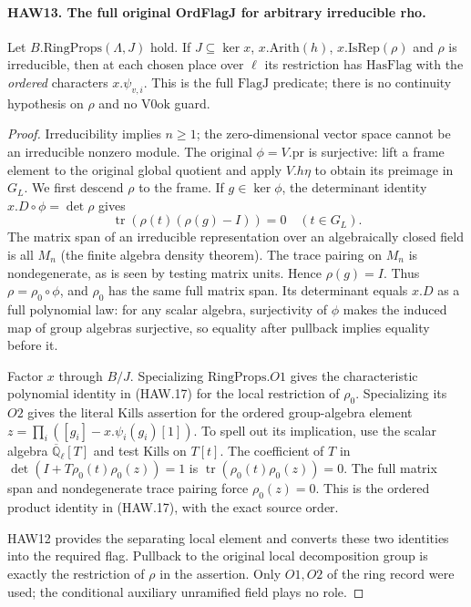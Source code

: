 \documentclass[11pt,a4paper]{article}
\numberwithin{equation}{section}
\theoremstyle{remark}\newtheorem{remark}[theorem]{Remark}
\begin{document}
\paragraph{HAW13. The full original OrdFlagJ for arbitrary irreducible rho.}
\label{claim:HAW13}
Let $B.\mathrm{RingProps}(\Lambda,J)$ hold.  If
$J\subseteq\ker x$, $x.\mathrm{Arith}(h)$,
$x.\mathrm{IsRep}(\rho)$ and $\rho$ is irreducible, then
at each chosen place over $\ell$ its restriction has
$\mathrm{HasFlag}$ with the \emph{ordered} characters
$x.\psi_{v,i}$.  This is the full $\mathrm{FlagJ}$ predicate;
there is no continuity hypothesis on $\rho$ and no
$\mathrm{V0ok}$ guard.
\begin{proof}
Irreducibility implies $n\ge1$; the zero-dimensional vector
space cannot be an irreducible nonzero module.  The original
$\phi=V.\mathrm{pr}$ is surjective: lift a frame element to
the original global quotient and apply $V.h\eta$ to obtain
its preimage in $G_L$.
We first descend $\rho$ to the frame.  If $g\in\ker\phi$,
the determinant identity $x.D\circ\phi=\det\rho$ gives
\[
          \operatorname{tr}(\rho(t)(\rho(g)-I))=0
                                           \quad(t\in G_L).
\]
The matrix span of an irreducible representation over an
algebraically closed field is all $M_n$ (the finite algebra
density theorem).  The trace pairing on $M_n$ is
nondegenerate, as is seen by testing matrix units.  Hence
$\rho(g)=I$.  Thus $\rho=\rho_0\circ\phi$, and $\rho_0$
has the same full matrix span.  Its determinant equals
$x.D$ as a full polynomial law: for any scalar algebra,
surjectivity of $\phi$ makes the induced map of group
algebras surjective, so equality after pullback implies
equality before it.

Factor $x$ through $B/J$.  Specializing $\mathrm{RingProps}.O1$
gives the characteristic polynomial identity in (HAW.17)
for the local restriction of $\rho_0$.  Specializing its
$O2$ gives the literal $\mathrm{Kills}$ assertion for the
ordered group-algebra element
$z=\prod_i([g_i]-x.\psi_i(g_i)[1])$.
To spell out its implication, use the scalar algebra
$\overline{\mathbb Q}_\ell[T]$ and test $\mathrm{Kills}$
on $T[t]$.  The coefficient of $T$ in
$\det(I+T\rho_0(t)\rho_0(z))=1$ is
$\operatorname{tr}(\rho_0(t)\rho_0(z))=0$.
The full matrix span and nondegenerate trace pairing force
$\rho_0(z)=0$.  This is the ordered product identity in
(HAW.17), with the exact source order.

HAW12 provides the separating local element and converts
these two identities into the required flag.  Pullback to
the original local decomposition group is exactly the
restriction of $\rho$ in the assertion.  Only $O1,O2$ of
the ring record were used; the conditional auxiliary
unramified field plays no role.
\end{proof}
\end{document}
